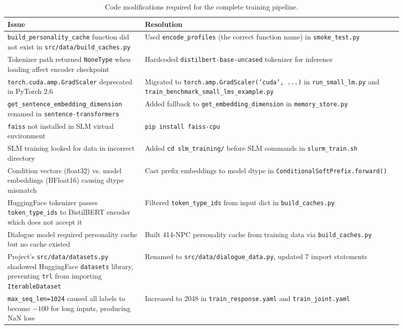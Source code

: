 \documentclass[11pt]{article}
\begin{document}
\begin{table}[h]
\centering
\caption{Code modifications required for the complete training pipeline.}
\label{tab:codefixes}
\small
\begin{tabular}{@{}p{0.32\linewidth}p{0.60\linewidth}@{}}
\toprule
\textbf{Issue} & \textbf{Resolution} \\
\midrule
\texttt{build\_personality\_cache} function did not exist in \texttt{src/data/build\_caches.py} & Used \texttt{encode\_profiles} (the correct function name) in \texttt{smoke\_test.py} \\
\midrule
Tokenizer path returned \texttt{NoneType} when loading affect encoder checkpoint & Hardcoded \texttt{distilbert-base-uncased} tokenizer for inference \\
\midrule
\texttt{torch.cuda.amp.GradScaler} deprecated in PyTorch 2.6 & Migrated to \texttt{torch.amp.GradScaler('cuda', ...)} in \texttt{run\_small\_lm.py} and \texttt{train\_benchmark\_small\_lms\_example.py} \\
\midrule
\texttt{get\_sentence\_embedding\_dimension} renamed in \texttt{sentence-transformers} & Added fallback to \texttt{get\_embedding\_dimension} in \texttt{memory\_store.py} \\
\midrule
\texttt{faiss} not installed in SLM virtual environment & \texttt{pip install faiss-cpu} \\
\midrule
SLM training looked for data in incorrect directory & Added \texttt{cd slm\_training/} before SLM commands in \texttt{slurm\_train.sh} \\
\midrule
Condition vectors (float32) vs. model embeddings (BFloat16) causing dtype mismatch & Cast prefix embeddings to model dtype in \texttt{ConditionalSoftPrefix.forward()} \\
\midrule
HuggingFace tokenizer passes \texttt{token\_type\_ids} to DistilBERT encoder which does not accept it & Filtered \texttt{token\_type\_ids} from input dict in \texttt{build\_caches.py} \\
\midrule
Dialogue model required personality cache but no cache existed & Built 414-NPC personality cache from training data via \texttt{build\_caches.py} \\
\midrule
Project's \texttt{src/data/datasets.py} shadowed HuggingFace \texttt{datasets} library, preventing \texttt{trl} from importing \texttt{IterableDataset} & Renamed to \texttt{src/data/dialogue\_data.py}, updated 7 import statements \\
\midrule
\texttt{max\_seq\_len=1024} caused all labels to become $-100$ for long inputs, producing NaN loss & Increased to 2048 in \texttt{train\_response.yaml} and \texttt{train\_joint.yaml} \\

\end{tabular}
\end{table}
\end{document}
